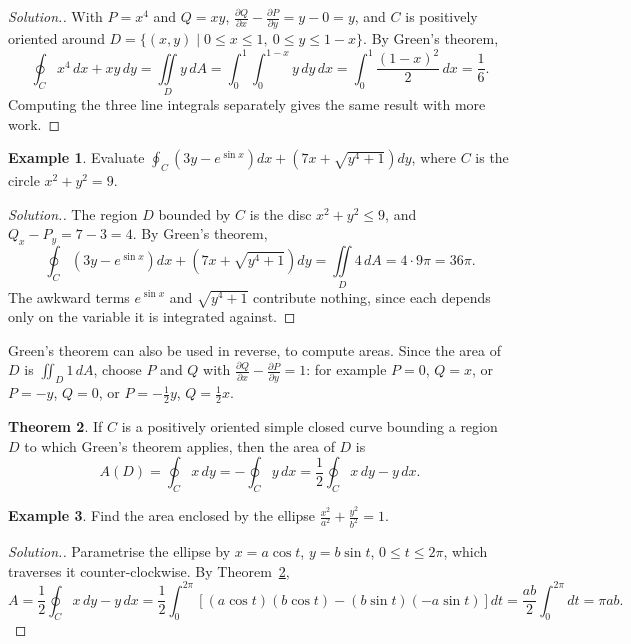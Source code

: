 \documentclass[11pt,a4paper]{article}
\theoremstyle{definition}
\newtheorem{thm}{Theorem}[subsection]
\newtheorem{exa}[thm]{Example}
\newenvironment{solution}
  {\renewcommand{\qedsymbol}{}\begin{proof}[\textit{Solution}.]}
  {\end{proof}}
\begin{document}
\begin{solution}
With $P = x^4$ and $Q = xy$, $\frac{\partial Q}{\partial x} - \frac{\partial
P}{\partial y} = y - 0 = y$, and $C$ is positively oriented around
$D = \{(x,y) \mid 0\leq x\leq 1,\ 0\leq y \leq 1 -x\}$. By Green's theorem,
\[\oint_C x^4\,dx + xy\,dy = \iint\limits_D y\,dA = \int^1_0 \int^{1-x}_0
y\,dy\,dx = \int_0^1\frac{(1-x)^2}{2}\,dx = \frac{1}{6} .\]
Computing the three line integrals separately gives the same result with more
work.
\end{solution}

\begin{exa}
\label{ex:greencircle}
Evaluate $\oint_C\left(3y - e^{\sin x}\right)dx + \left(7x + \sqrt{y^4 +
1}\right)dy$, where $C$ is the circle $x^2 + y^2 = 9$.
\end{exa}

\begin{solution}
The region $D$ bounded by $C$ is the disc $x^2 + y^2 \leq 9$, and
$Q_x - P_y = 7 - 3 = 4$. By Green's theorem,
\[\oint_C \left( 3y - e^{\sin x}\right) dx + \left( 7x + \sqrt{y^4 + 1}\right)
dy = \iint\limits_D 4\,dA = 4\cdot 9\pi = 36\pi .\]
The awkward terms $e^{\sin x}$ and $\sqrt{y^4 + 1}$ contribute nothing, since
each depends only on the variable it is integrated against.
\end{solution}

Green's theorem can also be used in reverse, to compute areas. Since the area of
$D$ is $\iint_D 1\,dA$, choose $P$ and $Q$ with
$\frac{\partial Q}{\partial x} - \frac{\partial P}{\partial y} = 1$: for example
$P = 0$, $Q = x$, or $P = -y$, $Q = 0$, or $P = -\frac{1}{2}y$, $Q = \frac{1}{2}x$.

\begin{thm}
\label{thm:greenarea}
If $C$ is a positively oriented simple closed curve bounding a region $D$ to
which Green's theorem applies, then the area of $D$ is
\[A(D) = \oint_C x\,dy = - \oint_C y\,dx = \frac{1}{2}\oint_C x\,dy - y\,dx .\]
\end{thm}

\begin{exa}
\label{ex:ellipsegreen}
Find the area enclosed by the ellipse $\frac{x^2}{a^2} + \frac{y^2}{b^2} = 1$.
\end{exa}

\begin{solution}
Parametrise the ellipse by $x = a \cos t$, $y = b\sin t$, $0\leq t \leq 2\pi$,
which traverses it counter-clockwise. By Theorem~\ref{thm:greenarea},
\[A = \frac{1}{2}\oint_C x\,dy - y\,dx = \frac{1}{2}\int^{2\pi}_0 \left[(a\cos t)
(b\cos t) - (b\sin t ) (-a\sin t)\right] dt = \frac{ab}{2}\int^{2\pi}_0 dt =
\pi ab .\]
\end{solution}
\end{document}
